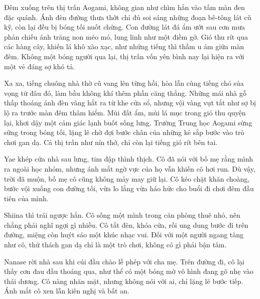 \documentclass[../main.tex]{subfiles}
\begin{document}

Đêm xuống trên thị trấn Aogami, không gian như chìm hẳn vào tấm màn đen đặc quánh. Ánh đèn đường thưa thớt chỉ đủ soi sáng những đoạn bê-tông lát cũ kỹ, còn lại đều bị bóng tối nuốt chửng. Con đường lát đá ẩm ướt sau cơn mưa phản chiếu ánh trăng non méo mó, lung linh như một điềm gở. Gió thu rít qua các hàng cây, khiến lá khô xào xạc, như những tiếng thì thầm u ám giữa màn đêm. Không một bóng người qua lại, thị trấn vốn yên bình nay lại hiện ra với một vẻ đáng sợ khó tả.

Xa xa, tiếng chuông nhà thờ cũ vang lên từng hồi, hòa lẫn cùng tiếng chó sủa vọng từ đâu đó, làm bầu không khí thêm phần căng thẳng. Những mái nhà gỗ thấp thoáng ánh đèn vàng hắt ra từ khe cửa sổ, nhưng vội vàng vụt tắt như sợ bị lộ ra trước màn đêm thâm hiểm. Mùi đất ẩm, mùi lá mục trong gió thu quyện lại, khơi dậy một cảm giác lạnh buốt sống lưng. Trường Trung học Aogami sừng sững trong bóng tối, lặng lẽ chờ đợi bước chân của những kẻ sắp bước vào trò chơi gan dạ. Cả thị trấn như nín thở, chỉ còn lại tiếng gió rít bên tai.

\ct

Yae khép cửa nhà sau lưng, tim đập thình thịch. Cô đã nói với bố mẹ rằng mình ra ngoài học nhóm, nhưng ánh mắt ngờ vực của họ vẫn khiến cô hơi run. Dù vậy, trời đã muộn, bố mẹ cô cũng không mảy may giữ lại. Cô kéo chặt khăn choàng, bước vội xuống con đường tối, vừa lo lắng vừa háo hức cho buổi đi chơi đêm đầu tiên của mình.

Shiina thì trái ngược hẳn. Cô sống một mình trong căn phòng thuê nhỏ, nên chẳng phải nghĩ ngợi gì nhiều. Cô tắt đèn, khóa cửa, rồi ung dung bước đi trên đường, miệng còn huýt sáo một khúc nhạc vui. Đối với một người ngang tàng như cô, thử thách gan dạ chỉ là một trò chơi, không có gì phải bận tâm.

Nanase rời nhà sau khi cúi đầu chào lễ phép với cha mẹ. Trên đường đi, cô lại thấy cơn đau đầu thoáng qua, như thể có một bóng mờ vô hình đang gõ nhẹ vào thái dương. Cô nàng nhăn mặt, nhưng không nói với ai, chỉ lặng lẽ bước tiếp. Ánh mắt cô xen lẫn kiên nghị và bất an.
\end{document}

